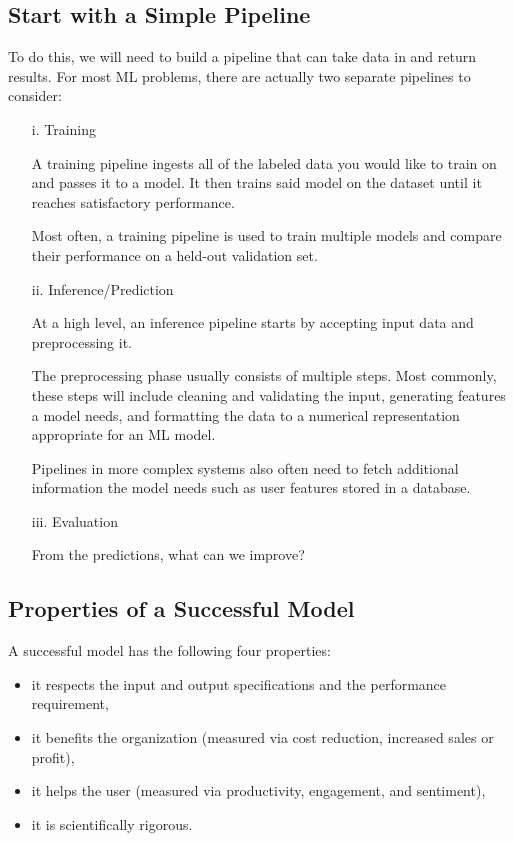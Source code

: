 \subsection*{Start with a Simple Pipeline}
To do this, we will need to build a pipeline that can take data in and
return results. For most ML problems, there are actually two separate
pipelines to consider:
\begin{enumerate}
    \item[i. Training] 
    
    A training pipeline ingests all of the labeled data you would like
    to train on and passes it to a model. It then trains said model on
    the dataset until it reaches satisfactory performance.
    
    Most often, a training pipeline is used to train multiple models
    and compare their performance on a held-out validation set.


    \item[ii. Inference/Prediction] 

    At a high level, an inference pipeline starts by accepting input
    data and preprocessing it.
    
    The preprocessing phase usually consists of multiple steps. Most
    commonly, these steps will include cleaning and validating the
    input, generating features a model needs, and formatting the data
    to a numerical representation appropriate for an ML model.
    
    Pipelines in more complex systems also often need to fetch
    additional information the model needs such as user features
    stored in a database.


    \item[iii. Evaluation]
    
    From the predictions, what can we improve?
\end{enumerate}




\subsection*{Properties of a Successful Model}
A successful model has the following four properties:
\begin{itemize}
    \item it respects the input and output specifications and the performance requirement,
    \item it benefits the organization (measured via cost reduction, increased sales or profit),
    \item it helps the user (measured via productivity, engagement, and sentiment),
    \item it is scientifically rigorous.
\end{itemize}






